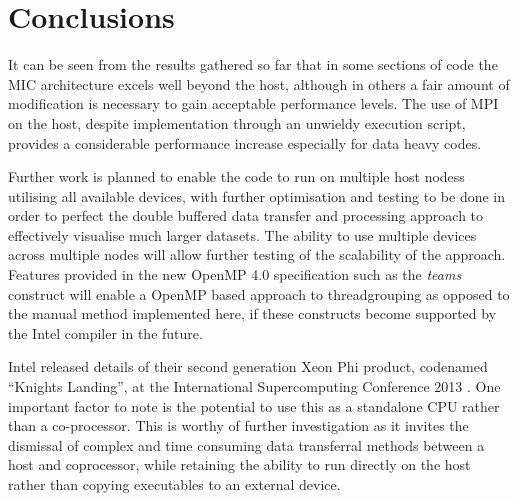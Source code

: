\documentclass[runningheads,a4paper]{llncs}
\begin{document}
\section{Conclusions}
\label{sect:conclusions}

It can be seen from the results gathered so far that in some sections of code the MIC architecture excels well beyond the host, 
although in others a fair amount of modification is necessary to gain acceptable performance levels. The use of MPI on the host, 
despite implementation through an unwieldy execution script, provides a considerable performance increase especially for data heavy 
codes. 

Further work is planned to enable the code to run on multiple host nodess utilising all available devices, with further optimisation and 
testing to be done in order to perfect the double buffered data transfer and processing approach to effectively visualise much larger 
datasets. The ability to use multiple devices across multiple nodes will allow further testing of the scalability of the approach. 
Features provided in the new OpenMP 4.0 specification such as the \textit{teams} construct will enable a OpenMP based approach to 
threadgrouping as opposed to the manual method implemented here, if these constructs become supported by the Intel compiler in the future. 

Intel released details of their second generation Xeon Phi product, codenamed “Knights Landing”,  at the International Supercomputing 
Conference 2013 \cite{knightlanding}. One important factor to note is the potential to use this as a standalone CPU rather than a co-processor. 
This is worthy of further investigation as it invites the dismissal of complex and time consuming data transferral methods between 
a host and coprocessor, while retaining the ability to run directly on the host rather than copying executables to an external device.
 

\end{document}
